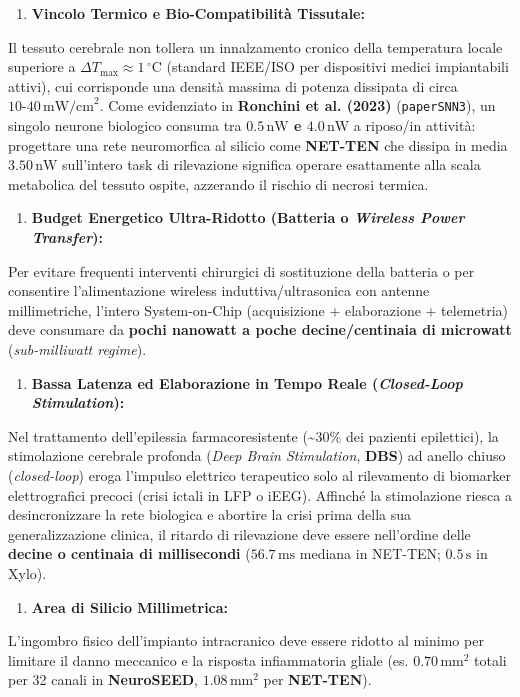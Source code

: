\documentclass[11pt,a4paper]{article}
\begin{document}
\begin{enumerate}
  \item \textbf{Vincolo Termico e Bio-Compatibilità Tissutale:}
\end{enumerate}
Il tessuto cerebrale non tollera un innalzamento cronico della temperatura locale superiore a \textbf{$\Delta T_{\max} \approx 1\,^\circ\text{C}$} (standard IEEE/ISO per dispositivi medici impiantabili attivi), cui corrisponde una densità massima di potenza dissipata di circa \textbf{$10\text{-}40\,\text{mW/cm}^2$}. Come evidenziato in \textbf{Ronchini et al. (2023)} (\texttt{paperSNN3}), un singolo neurone biologico consuma tra \textbf{$0.5\,\text{nW}$ e $4.0\,\text{nW}$} a riposo/in attività: progettare una rete neuromorfica al silicio come \textbf{NET-TEN} che dissipa in media \textbf{$3.50\,\text{nW}$} sull'intero task di rilevazione significa operare esattamente alla scala metabolica del tessuto ospite, azzerando il rischio di necrosi termica.
\begin{enumerate}
  \item \textbf{Budget Energetico Ultra-Ridotto (Batteria o \textit{Wireless Power Transfer}):}
\end{enumerate}
Per evitare frequenti interventi chirurgici di sostituzione della batteria o per consentire l'alimentazione wireless induttiva/ultrasonica con antenne millimetriche, l'intero System-on-Chip (acquisizione + elaborazione + telemetria) deve consumare da \textbf{pochi nanowatt a poche decine/centinaia di microwatt} (\textit{sub-milliwatt regime}).
\begin{enumerate}
  \item \textbf{Bassa Latenza ed Elaborazione in Tempo Reale (\textit{Closed-Loop Stimulation}):}
\end{enumerate}
Nel trattamento dell'epilessia farmacoresistente (\textasciitilde{}30\% dei pazienti epilettici), la stimolazione cerebrale profonda (\textit{Deep Brain Stimulation}, \textbf{DBS}) ad anello chiuso (\textit{closed-loop}) eroga l'impulso elettrico terapeutico solo al rilevamento di biomarker elettrografici precoci (crisi ictali in LFP o iEEG). Affinché la stimolazione riesca a desincronizzare la rete biologica e abortire la crisi prima della sua generalizzazione clinica, il ritardo di rilevazione deve essere nell'ordine delle \textbf{decine o centinaia di millisecondi} ($56.7\,\text{ms}$ mediana in NET-TEN; $0.5\,\text{s}$ in Xylo).
\begin{enumerate}
  \item \textbf{Area di Silicio Millimetrica:}
\end{enumerate}
L'ingombro fisico dell'impianto intracranico deve essere ridotto al minimo per limitare il danno meccanico e la risposta infiammatoria gliale (es. \textbf{$0.70\,\text{mm}^2$} totali per 32 canali in \textbf{NeuroSEED}, \textbf{$1.08\,\text{mm}^2$} per \textbf{NET-TEN}).
\end{document}
